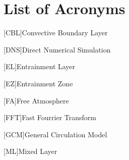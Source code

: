 
\chapter{List of Acronyms}







\begin{acronym}
[CBL]{Convective Boundary Layer}
\end{acronym}

\begin{acronym}
[DNS]{Direct Numerical Simulation}
\end{acronym}

\begin{acronym}
[EL]{Entrainment Layer}
\end{acronym}

\begin{acronym}
[EZ]{Entrainment Zone}
\end{acronym}


\begin{acronym}
[FA]{Free Atmosphere}
\end{acronym}

\begin{acronym}
[FFT]{Fast Fourrier Transform}
\end{acronym}

\begin{acronym}
[GCM]{General Circulation Model}
\end{acronym}

\begin{acronym}
[ML]{Mixed Layer}
\end{acronym}

